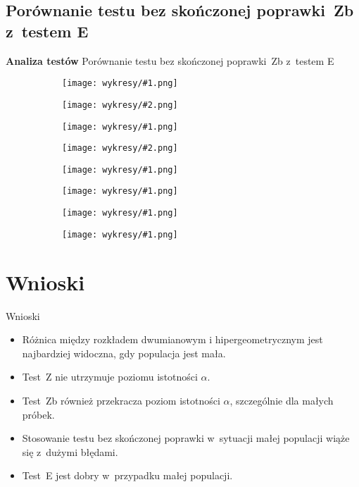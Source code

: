 \documentclass{beamer}
\newcommand{\1}[1]{\mathds{1}\left(#1\right)}
\newenvironment{subdiagrams}[2]{
	\begin{subfigure}{.35\textwidth}
		\centering
		\texttt{[image: wykresy/\#1.png]}
		\caption{}
		\label{#1}
	\end{subfigure}
	\begin{subfigure}{.35\textwidth}
		\centering
		\texttt{[image: wykresy/\#2.png]}
		\caption{}
		\label{#2}
	\end{subfigure}
} {}
\newenvironment{subdiagram}[1]{
	\begin{subfigure}{.45\textwidth}
		\centering
		\texttt{[image: wykresy/\#1.png]}
		\caption{}
		\label{#1}
	\end{subfigure}
} {}
\begin{document}
\subsection{Porównanie testu bez skończonej poprawki~Zb z~testem E}
\begin{frame}
	\begin{alertblock}{\centering \Huge \textbf{Analiza testów}} 
		\Large \centering Porównanie testu bez skończonej poprawki~Zb z~testem E
	\end{alertblock}
\end{frame}

\begin{frame}
\begin{figure}[p]
	\caption{Prawdopodobieństwo błędu I~rodzaju testów~Zb i~E jako funkcja rozmiaru próbki $n$; $\alpha=0.05$; $N_1=N_2=100$}
	\begin{subdiagrams}{sizeZbE_p_0_1}{sizeZbE_p_0_1_n1_10}
	\end{subdiagrams}
	
	\begin{subdiagrams}{sizeZbE_p_0_3}{sizeZbE_p_0_3_n1_5}
	\end{subdiagrams}
\end{figure}
\end{frame}

\begin{frame}
\begin{figure}[p]
	\caption{Moc testów~Zb i~E jako funkcja rozmiaru próbki $n$}
	\begin{subdiagram}{powerZbE_N1_30_N2_50_p_0_6}
	\end{subdiagram}
	\begin{subdiagram}{powerZbE_N_100_p_0_1}
	\end{subdiagram}
	\begin{subdiagram}{powerZbE_N1_100_N2_200_p_0_1}
	\end{subdiagram}
	\begin{subdiagram}{powerZbE_N1_3000_N2_100_p_0_6}
	\end{subdiagram}
\end{figure}
\end{frame}

\section{Wnioski}
\begin{frame}{Wnioski}
\begin{itemize} [<+->]
\item Różnica między rozkładem dwumianowym i hipergeometrycznym jest najbardziej widoczna, gdy populacja jest mała.
\item Test~Z nie utrzymuje poziomu istotności $\alpha$.
\item Test~Zb również przekracza poziom istotności $\alpha$, szczególnie dla małych próbek.
\item Stosowanie testu bez skończonej poprawki w~sytuacji małej populacji wiąże się z~dużymi błędami.
\item Test~E jest dobry w~przypadku małej populacji.
\end{itemize}
\end{frame}
\end{document}
